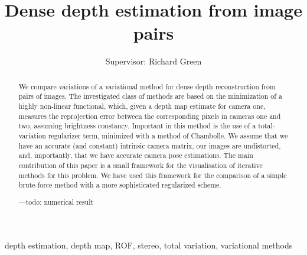 \documentclass[conference]{IEEEtran}
\begin{document}
\title{Dense depth estimation from image pairs}

\author{
Supervisor: Richard Green\\
}

\maketitle

\begin{abstract}
We compare variations of a variational method for dense
depth reconstruction from pairs of images.
The investigated class of methods are based on the minimization of a highly non-linear functional, which, given
a depth map estimate for camera one, measures the reprojection error between the corresponding
pixels in cameras one and two, assuming brightness constancy.
Important in this method is the use of a total-variation regularizer term, minimized with a method of Chambolle.
We assume that we have an accurate (and constant) intrinsic camera matrix,
our images are undistorted, and, importantly, that we have accurate camera pose estimations.
The main contribution of this paper is a small framework for the visualisation of iterative methods for this problem. We have
used this framework for the comparison of a simple brute-force method with a more sophisticated regularized scheme.

---todo: numerical result

\end{abstract}

\begin{IEEEkeywords}
depth estimation,
depth map,
ROF,
stereo,
total variation,
variational methods
\end{IEEEkeywords}
\end{document}
